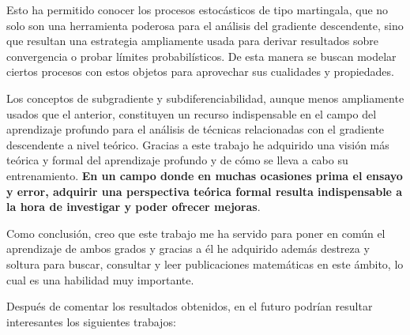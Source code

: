
Esto ha permitido conocer los procesos estocásticos de tipo martingala, que no solo son una herramienta poderosa para el análisis del gradiente descendente, sino que resultan una estrategia ampliamente usada para derivar resultados sobre convergencia o probar límites probabilísticos. De esta manera se buscan modelar ciertos procesos con estos objetos para aprovechar sus cualidades y propiedades.

Los conceptos de subgradiente y subdiferenciabilidad, aunque menos ampliamente usados que el anterior, constituyen un recurso indispensable en el campo del aprendizaje profundo para el análisis de técnicas relacionadas con el gradiente descendente a nivel teórico. Gracias a este trabajo he adquirido una visión más teórica y formal del aprendizaje profundo y de cómo se lleva a cabo su entrenamiento. \textbf{En un campo donde en muchas ocasiones prima el ensayo y error, adquirir una perspectiva teórica formal resulta indispensable a la hora de investigar y poder ofrecer mejoras}.

Como conclusión, creo que este trabajo me ha servido para poner en común el aprendizaje de ambos grados y gracias a él he adquirido además destreza y soltura para buscar, consultar y leer publicaciones matemáticas en este ámbito, lo cual es una habilidad muy importante.




Después de comentar los resultados obtenidos, en el futuro podrían resultar interesantes los siguientes trabajos:

